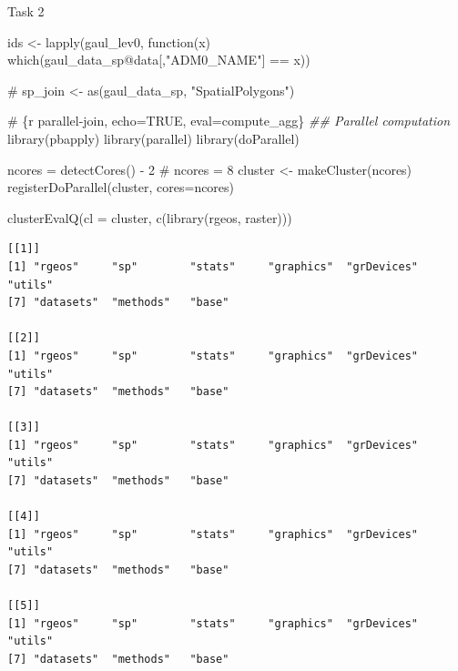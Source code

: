 \documentclass[
  ignorenonframetext,
  aspectratio=169,
]{beamer}
\newenvironment{Shaded}{\begin{snugshade}}{\end{snugshade}}
\newcommand{\AttributeTok}[1]{\textcolor[rgb]{0.40,0.45,0.13}{#1}}
\newcommand{\CommentTok}[1]{\textcolor[rgb]{0.37,0.37,0.37}{#1}}
\newcommand{\ControlFlowTok}[1]{\textcolor[rgb]{0.00,0.23,0.31}{#1}}
\newcommand{\DecValTok}[1]{\textcolor[rgb]{0.68,0.00,0.00}{#1}}
\newcommand{\DocumentationTok}[1]{\textcolor[rgb]{0.37,0.37,0.37}{\textit{#1}}}
\newcommand{\FunctionTok}[1]{\textcolor[rgb]{0.28,0.35,0.67}{#1}}
\newcommand{\NormalTok}[1]{\textcolor[rgb]{0.00,0.23,0.31}{#1}}
\newcommand{\OtherTok}[1]{\textcolor[rgb]{0.00,0.23,0.31}{#1}}
\newcommand{\SpecialCharTok}[1]{\textcolor[rgb]{0.37,0.37,0.37}{#1}}
\newcommand{\StringTok}[1]{\textcolor[rgb]{0.13,0.47,0.30}{#1}}
\begin{document}
\begin{frame}[fragile]{Task 2}
\begin{Shaded}
\begin{Highlighting}[]
\NormalTok{ids }\OtherTok{\textless{}{-}} \FunctionTok{lapply}\NormalTok{(gaul\_lev0, }\ControlFlowTok{function}\NormalTok{(x) }\FunctionTok{which}\NormalTok{(gaul\_data\_sp}\SpecialCharTok{@}\NormalTok{data[,}\StringTok{"ADM0\_NAME"}\NormalTok{] }\SpecialCharTok{==}\NormalTok{ x))}

\CommentTok{\# sp\_join \textless{}{-} as(gaul\_data\_sp, "SpatialPolygons")}
\end{Highlighting}
\end{Shaded}

\linespread{2}

\linespread{0.5}

\begin{Shaded}
\begin{Highlighting}[]
\CommentTok{\# \textasciigrave{}\textasciigrave{}\textasciigrave{}\{r parallel{-}join, echo=TRUE, eval=compute\_agg\}}
\DocumentationTok{\#\# Parallel computation}
\FunctionTok{library}\NormalTok{(pbapply)}
\FunctionTok{library}\NormalTok{(parallel)}
\FunctionTok{library}\NormalTok{(doParallel)}

\NormalTok{ncores }\OtherTok{=} \FunctionTok{detectCores}\NormalTok{() }\SpecialCharTok{{-}} \DecValTok{2}
\CommentTok{\# ncores = 8}
\NormalTok{cluster }\OtherTok{\textless{}{-}} \FunctionTok{makeCluster}\NormalTok{(ncores)}
\FunctionTok{registerDoParallel}\NormalTok{(cluster, }\AttributeTok{cores=}\NormalTok{ncores)}

\FunctionTok{clusterEvalQ}\NormalTok{(}\AttributeTok{cl =}\NormalTok{ cluster, }\FunctionTok{c}\NormalTok{(}\FunctionTok{library}\NormalTok{(rgeos, raster)))}
\end{Highlighting}
\end{Shaded}

\begin{verbatim}
[[1]]
[1] "rgeos"     "sp"        "stats"     "graphics"  "grDevices" "utils"    
[7] "datasets"  "methods"   "base"     

[[2]]
[1] "rgeos"     "sp"        "stats"     "graphics"  "grDevices" "utils"    
[7] "datasets"  "methods"   "base"     

[[3]]
[1] "rgeos"     "sp"        "stats"     "graphics"  "grDevices" "utils"    
[7] "datasets"  "methods"   "base"     

[[4]]
[1] "rgeos"     "sp"        "stats"     "graphics"  "grDevices" "utils"    
[7] "datasets"  "methods"   "base"     

[[5]]
[1] "rgeos"     "sp"        "stats"     "graphics"  "grDevices" "utils"    
[7] "datasets"  "methods"   "base"     


\end{verbatim}
\end{frame}
\end{document}
